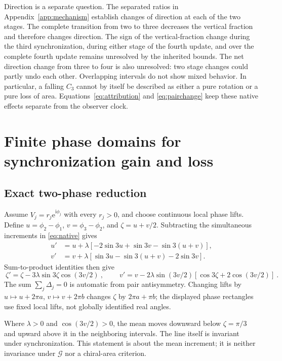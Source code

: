 \documentclass[11pt,a4paper]{article}
\numberwithin{equation}{section}
\newcommand{\ii}{\mathrm i}
\newcommand{\e}{\mathrm e}
\newcommand{\Gmap}{\mathcal G}
\begin{document}
Direction is a separate question. The separated ratios in
Appendix~\ref{app:mechanism} establish changes of direction at each of the
two stages. The complete transition from two to three decreases the
vertical fraction and therefore changes direction. The sign of the
vertical-fraction change during the third synchronization, during either
stage of the fourth update, and over the complete fourth update remains
unresolved by the inherited bounds. The net direction change from three
to four is also unresolved: two stage changes could partly undo each other.
Overlapping intervals do not show mixed behavior. In particular, a falling
$C_3$ cannot by itself be described as either a pure rotation or a pure
loss of area. Equations~\eqref{eq:attribution} and \eqref{eq:pairchange}
keep these native effects separate from the observer clock.

\section{Finite phase domains for synchronization gain and loss}\label{sec:phase}
\subsection{Exact two-phase reduction}
Assume $V_j=r_j\e^{\ii\phi_j}$ with every $r_j>0$, and choose continuous
local phase lifts. Define $u=\phi_2-\phi_1$, $v=\phi_3-\phi_2$, and
$\zeta=u+v/2$. Subtracting the simultaneous increments in
\eqref{eq:native} gives
\begin{equation}\label{eq:relative}
\begin{aligned}
u'&=u+\lambda[-2\sin3u+\sin3v-\sin3(u+v)],\\
v'&=v+\lambda[\sin3u-\sin3(u+v)-2\sin3v].
\end{aligned}
\end{equation}
Sum-to-product identities then give
\begin{equation}\label{eq:meanphase}
\boxed{\ \zeta'=\zeta-3\lambda\sin3\zeta\cos(3v/2)\ },\qquad
\boxed{\ v'=v-2\lambda\sin(3v/2)
[\cos3\zeta+2\cos(3v/2)]\ }.
\end{equation}
The sum $\sum_j\Delta_j=0$ is automatic from pair antisymmetry.
Changing lifts by $u\mapsto u+2\pi a$, $v\mapsto v+2\pi b$ changes
$\zeta$ by $2\pi a+\pi b$; the displayed phase rectangles use fixed local
lifts, not globally identified real angles.

Where $\lambda>0$ and $\cos(3v/2)>0$, the mean moves downward below
$\zeta=\pi/3$ and upward above it in the neighboring intervals.
The line itself is invariant under synchronization. This statement is about
the mean increment; it is neither invariance under $\Gmap$ nor a chiral-area
criterion.
\end{document}
